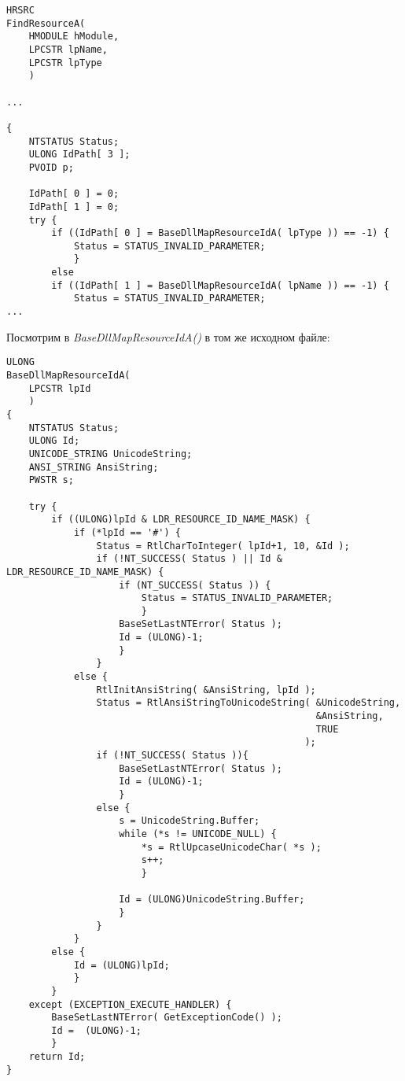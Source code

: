 \begin{lstlisting}[style=customc]
HRSRC
FindResourceA(
    HMODULE hModule,
    LPCSTR lpName,
    LPCSTR lpType
    )

...

{
    NTSTATUS Status;
    ULONG IdPath[ 3 ];
    PVOID p;

    IdPath[ 0 ] = 0;
    IdPath[ 1 ] = 0;
    try {
        if ((IdPath[ 0 ] = BaseDllMapResourceIdA( lpType )) == -1) {
            Status = STATUS_INVALID_PARAMETER;
            }
        else
        if ((IdPath[ 1 ] = BaseDllMapResourceIdA( lpName )) == -1) {
            Status = STATUS_INVALID_PARAMETER;
...
\end{lstlisting}

Посмотрим в \emph{BaseDllMapResourceIdA()} в том же исходном файле:

\begin{lstlisting}[style=customc]
ULONG
BaseDllMapResourceIdA(
    LPCSTR lpId
    )
{
    NTSTATUS Status;
    ULONG Id;
    UNICODE_STRING UnicodeString;
    ANSI_STRING AnsiString;
    PWSTR s;

    try {
        if ((ULONG)lpId & LDR_RESOURCE_ID_NAME_MASK) {
            if (*lpId == '#') {
                Status = RtlCharToInteger( lpId+1, 10, &Id );
                if (!NT_SUCCESS( Status ) || Id & LDR_RESOURCE_ID_NAME_MASK) {
                    if (NT_SUCCESS( Status )) {
                        Status = STATUS_INVALID_PARAMETER;
                        }
                    BaseSetLastNTError( Status );
                    Id = (ULONG)-1;
                    }
                }
            else {
                RtlInitAnsiString( &AnsiString, lpId );
                Status = RtlAnsiStringToUnicodeString( &UnicodeString,
                                                       &AnsiString,
                                                       TRUE
                                                     );
                if (!NT_SUCCESS( Status )){
                    BaseSetLastNTError( Status );
                    Id = (ULONG)-1;
                    }
                else {
                    s = UnicodeString.Buffer;
                    while (*s != UNICODE_NULL) {
                        *s = RtlUpcaseUnicodeChar( *s );
                        s++;
                        }

                    Id = (ULONG)UnicodeString.Buffer;
                    }
                }
            }
        else {
            Id = (ULONG)lpId;
            }
        }
    except (EXCEPTION_EXECUTE_HANDLER) {
        BaseSetLastNTError( GetExceptionCode() );
        Id =  (ULONG)-1;
        }
    return Id;
}
\end{lstlisting}

